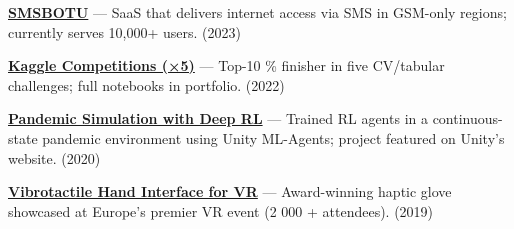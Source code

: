 \begin{zitemize}
\item \href{https://smsbotu.com/}{\textbf{SMSBOTU}} — SaaS that delivers internet access via SMS in GSM-only regions; currently serves 10,000+ users. (2023)
  \item \href{https://hosgungor.com/#projects}{\textbf{Kaggle Competitions (×5)}} — Top-10 \% finisher in five CV/tabular challenges; full notebooks in portfolio. (2022)
  \item \href{https://github.com/Hsgngr/Pandemic_Simulation}{\textbf{Pandemic Simulation with Deep RL}} — Trained RL agents in a continuous-state pandemic environment using Unity ML-Agents; project featured on Unity’s website. (2020)
  \item \href{https://youtu.be/UaCITyHXu8I}{\textbf{Vibrotactile Hand Interface for VR}} — Award-winning haptic glove showcased at Europe’s premier VR event (2 000 + attendees). (2019)
\end{zitemize}